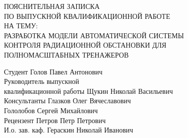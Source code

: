 \begin{center}
	\large
	\hfill \break \hfill \break \hfill \break \hfill \break
	ПОЯСНИТЕЛЬНАЯ ЗАПИСКА\\ ПО ВЫПУСКНОЙ КВАЛИФИКАЦИОННОЙ РАБОТЕ\\ НА ТЕМУ:\\[1.5cm]

	\normalsize
	РАЗРАБОТКА МОДЕЛИ АВТОМАТИЧЕСКОЙ СИСТЕМЫ \\ КОНТРОЛЯ РАДИАЦИОННОЙ ОБСТАНОВКИ ДЛЯ \\ПОЛНОМАСШТАБНЫХ ТРЕНАЖЕРОВ\\[6.0cm]
\end{center}

\noindent
\small
Студент \hspace{4.2cm} \underline{\hspace{4.2cm}} \hspace{0.7cm} Голов Павел Антонович\\

\noindent
Руководитель выпускной\\ квалификационной работы \hspace{0.85cm} \underline{\hspace{4.2cm}} \hspace{0.7cm} Щукин Николай Васильевич\\

\noindent
Консультанты \hspace{3.1cm} \underline{\hspace{4.2cm}} \hspace{0.7cm} Глазков Олег Вячеславович\\
			 
			 \hspace{5.0cm} \underline{\hspace{4.2cm}} \hspace{0.7cm} Гололобов Сергей Михайлович\\

\noindent
Рецензент \hspace{3.85cm} \underline{\hspace{4.2cm}} \hspace{0.7cm} Петров Петр Петрович\\

\noindent
И.о. зав. каф. \hspace{3.25cm} \underline{\hspace{4.2cm}} \hspace{0.7cm} Гераскин Николай Иванович\\[0.6cm]

